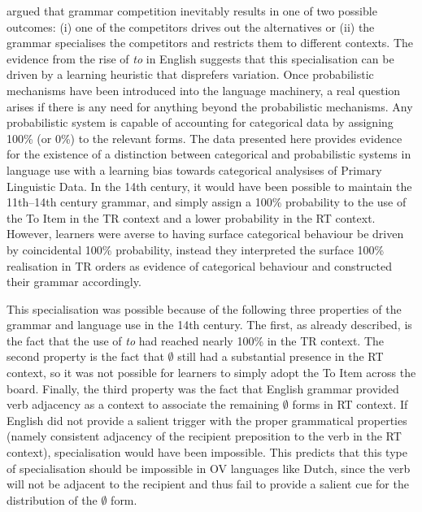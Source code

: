 	\cite{Wallenberg.2013} argued that grammar competition inevitably results in one of two possible outcomes: (i) one of the competitors drives out the alternatives or (ii) the grammar specialises the competitors and restricts them to different contexts. The evidence from the rise of \textit{to} in English suggests that this specialisation can be driven by a learning heuristic that disprefers variation. Once probabilistic mechanisms have been introduced into the language machinery, a real question arises if there is any need for anything beyond the probabilistic mechanisms. Any probabilistic system is capable of accounting for categorical data by assigning 100\% (or 0\%) to the relevant forms. The data presented here provides evidence for the existence of a distinction between categorical and probabilistic systems in language use with a learning bias towards categorical analysises of Primary Linguistic Data. In the 14th century, it would have been possible to maintain the 11th--14th century grammar, and simply assign a 100\% probability to the use of the To Item in the TR context and a lower probability in the RT context. However, learners were averse to having surface categorical behaviour be driven by coincidental 100\% probability, instead they interpreted the surface 100\% realisation in TR orders as evidence of categorical behaviour and constructed their grammar accordingly.

	This specialisation was possible because of the following three properties of the grammar and language use in the 14th century. The first, as already described, is the fact that the use of \textit{to} had reached nearly 100\% in the TR context. The second property is the fact that $\emptyset$ still had a substantial presence in the RT context, so it was not possible for learners to simply adopt the To Item across the board. Finally, the third property was the fact that English grammar provided verb adjacency as a context to associate the remaining $\emptyset$ forms in RT context. If English did not provide a salient trigger with the proper grammatical properties (namely consistent adjacency of the recipient preposition to the verb in the RT context), specialisation would have been impossible. This predicts that this type of specialisation should be impossible in OV languages like Dutch, since the verb will not be adjacent to the recipient and thus fail to provide a salient cue for the distribution of the $\emptyset$ form. 

